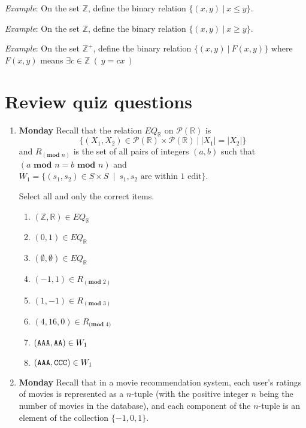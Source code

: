 \documentclass[12pt, oneside]{article}
\begin{document}
{\it Example}: On the set $\mathbb{Z}$, define the binary relation 
$\{ (x,y) ~|~x \leq y\}$. 

\vfill

{\it Example}: On the set $\mathbb{Z}$, define the binary relation 
$\{ (x,y) ~|~x \geq y\}$. 

\vfill

{\it Example}: On the set $\mathbb{Z}^+$, define the binary relation 
$\{ (x,y) ~|~ F(x,y) \}$ where $F(x,y)$ means $\exists c \in \mathbb{Z} ~(~y = cx~)$

\vfill


\newpage
\section*{Review quiz questions}
\begin{enumerate}

\item {\bf Monday} Recall that the relation $EQ_{\mathbb{R}}$ on $\mathcal{P}(\mathbb{R})$ is
\[
\{ (X_1, X_2 ) \in\mathcal{P}(\mathbb{R})  \times \mathcal{P}(\mathbb{R}) ~|~ |X_1| = |X_2| \}
\]
and $R_{(\textbf{mod } n)}$ is the set of all pairs of integers $(a, b)$ such that $(a \textbf{ mod } n = b \textbf{ mod } n)$
and $W_1 = \{ (s_1, s_2) \in S \times S ~\mid~ s_1, s_2 \textrm{ are within 1 edit}\}$.

Select all and only the correct items.
\begin{enumerate}
\item $(\mathbb{Z}, \mathbb{R}) \in EQ_{\mathbb{R}}$
\item $(0,1) \in EQ_{\mathbb{R}}$
\item $(\emptyset, \emptyset) \in EQ_{\mathbb{R}}$
\item $(-1,1) \in R_{(\textbf{mod } 2)}$
\item $(1,-1) \in R_{(\textbf{mod } 3)}$ 
\item $(4, 16, 0) \in R_{\textbf{(mod } 4)}$ 
\item $(\texttt{A}\texttt{A}\texttt{A}, \texttt{A}\texttt{A}) \in W_1$
\item $(\texttt{A}\texttt{A}\texttt{A}, \texttt{C}\texttt{C}\texttt{C}) \in W_1$
\end{enumerate}



\item {\bf Monday} Recall that 
in a movie recommendation system, each 
user's ratings of movies is represented as a $n$-tuple (with the positive integer $n$  being the number of movies in the database), and each  component of 
the $n$-tuple is an element of  the collection $\{-1,0,1\}$.


\end{enumerate}
\end{document}
